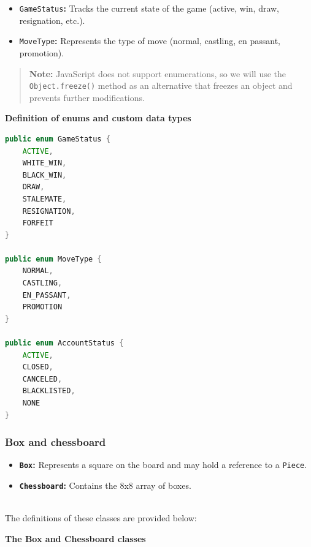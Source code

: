 \begin{itemize}
\item
\protect{}\label{VyaPELwvkSUb04qDYADcq}
\texttt{GameStatus}\textbf{:} Tracks the current state of the game (active, win, draw, resignation, etc.).
\item
\protect{}\label{5__ZXldyNyaC_r9HLR2t8}
\texttt{MoveType}\textbf{:} Represents the type of move (normal, castling, en passant, promotion).
\end{itemize}
\begin{quote}
\textbf{Note:} JavaScript does not support enumerations, so we will use the \texttt{Object.freeze()} method as an alternative that freezes an object and prevents further modifications.
\end{quote}

\textbf{Definition of enums and custom data types}

\begin{lstlisting}[language=Java]
public enum GameStatus {
    ACTIVE,
    WHITE_WIN,
    BLACK_WIN,
    DRAW,
    STALEMATE,
    RESIGNATION,
    FORFEIT
}

public enum MoveType {
    NORMAL,
    CASTLING,
    EN_PASSANT,
    PROMOTION
}

public enum AccountStatus {
    ACTIVE,
    CLOSED,
    CANCELED,
    BLACKLISTED,
    NONE
}
\end{lstlisting}

\subsubsection{Box and chessboard}\label{mn3zfNeJYir-RBT9xIj9B}

\begin{itemize}
\item
\protect{}\label{7brokEn5QxoZm72rRxoW-}
\textbf{\texttt{Box}:} Represents a square on the board and may hold a reference to a \texttt{Piece}.
\item
\protect{}\label{75aGrxwCCQHq2cI0xZ2yu}
\textbf{\texttt{Chessboard}:} Contains the 8x8 array of boxes.
\end{itemize}
\\
The definitions of these classes are provided below:

\textbf{The Box and Chessboard classes}

